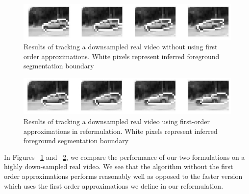 \begin{figure}[t]
\begin{center}
	\includegraphics[scale=0.35]{figures/car_tracking.jpg}
	\caption{Results of tracking a downsampled real video without using first order approximations. White pixels represent inferred foreground segmentation boundary}
	\label{fig:trackCar}
\end{center}
\end{figure}

\begin{figure}[t]
\begin{center}
	\includegraphics[scale=0.35]{figures/horn_schunk_car_tracking.jpg}
	\caption{Results of tracking a downsampled real video using first-order approximations in reformulation. White pixels represent inferred foreground segmentation boundary}
	\label{fig:HStrackCar}
\end{center}
\end{figure}

In Figures ~\ref{fig:trackCar} and ~\ref{fig:HStrackCar}, we compare the performance of our two formulations on a highly down-sampled real video. We see that the algorithm without the first order approximations performs reasonably well as opposed to the faster version which uses the first order approximations we define in our reformulation.